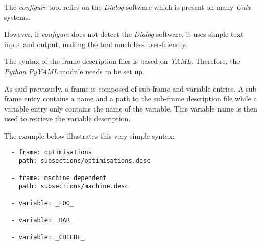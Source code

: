 

The \textit{configure} tool relies on the \textit{Dialog} software which
is present on many \textit{Unix} systems.

However, if \textit{configure} does not detect the \textit{Dialog} software,
it uses simple text input and output, making the tool much less user-friendly.



The syntax of the frame description files is based on \textit{YAML}. Therefore,
the \textit{Python} \textit{PyYAML} module needs to be set up.

As said previously, a frame is composed of sub-frame and variable entries. A
sub-frame entry contains a name and a path to the sub-frame description file
while a variable entry only contains the name of the variable. This variable
name is then used to retrieve the variable description.

The example below illustrates this very simple syntax:

\begin{verbatim}
  - frame: optimisations
    path: subsections/optimisations.desc

  - frame: machine dependent
    path: subsections/machine.desc

  - variable: _FOO_

  - variable: _BAR_

  - variable: _CHICHE_
\end{verbatim}
